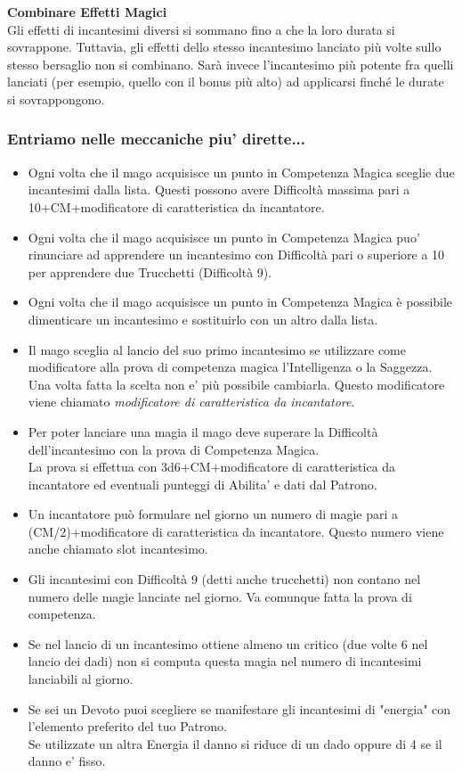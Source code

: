 \textbf{Combinare Effetti Magici}\\
Gli effetti di incantesimi diversi si sommano fino a che la loro durata si sovrappone. Tuttavia, gli effetti dello stesso incantesimo lanciato più volte sullo stesso bersaglio non si combinano. Sarà invece l'incantesimo più potente fra quelli lanciati (per esempio, quello con il bonus più alto) ad applicarsi finché le durate si sovrappongono.\\


\subsubsection{Entriamo nelle meccaniche piu' dirette...}

\begin{itemize}

\item 
Ogni volta che il mago acquisisce un punto in Competenza Magica sceglie due incantesimi dalla lista. Questi possono avere Difficoltà massima pari a 10+CM+modificatore di caratteristica da incantatore.
\item
Ogni volta che il mago acquisisce un punto in Competenza Magica puo' rinunciare ad apprendere un incantesimo con Difficoltà pari o superiore a 10 per apprendere due Trucchetti (Difficoltà 9).
\item 
Ogni volta che il mago acquisisce un punto in Competenza Magica è possibile dimenticare un incantesimo e sostituirlo con un altro dalla lista.
\item 
Il mago sceglia al lancio del suo primo incantesimo se utilizzare come modificatore alla prova di competenza magica l'Intelligenza o la Saggezza. Una volta fatta la scelta non e' più possibile cambiarla. Questo modificatore viene chiamato \emph{modificatore di caratteristica da incantatore}.
\item
Per poter lanciare una magia il mago deve superare la Difficoltà dell'incantesimo con la prova di Competenza Magica.\\
La prova si effettua con 3d6+CM+modificatore di caratteristica da incantatore ed eventuali punteggi di Abilita' e dati dal Patrono.
\item 
Un incantatore può formulare nel giorno un numero di magie pari a (CM/2)+modificatore di caratteristica da incantatore. Questo numero viene anche chiamato slot incantesimo.
\item 
Gli incantesimi con Difficoltà 9 (detti anche trucchetti) non contano nel numero delle magie lanciate nel giorno. Va comunque fatta la prova di competenza.
\item
Se nel lancio di un incantesimo ottiene almeno un critico (due volte 6 nel lancio dei dadi) non si computa questa magia nel numero di incantesimi lanciabili al giorno.
\item
Se sei un Devoto puoi scegliere se manifestare gli incantesimi di "energia" con l'elemento preferito del tuo Patrono.\\
Se utilizzate un altra Energia il danno si riduce di un dado oppure di 4 se il danno e' fisso.
\end{itemize}

